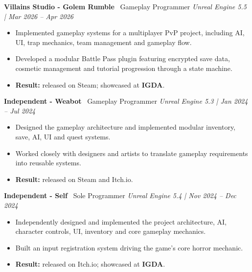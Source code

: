 \documentclass[8.5pt]{article}
\begin{document}
    \vspace{2pt}

    \textbf{Villains Studio - Golem Rumble} \textemdash\ Gameplay Programmer
    \hfill
    \textit{Unreal Engine 5.5 | Mar 2026 -- Apr 2026}

    \begin{itemize}
        \item Implemented gameplay systems for a multiplayer PvP project, including AI, UI, trap mechanics, team management and gameplay flow.
        \item Developed a modular Battle Pass plugin featuring encrypted save data, cosmetic management and tutorial progression through a state machine.
        \item \textbf{Result:} released on Steam; showcased at \textbf{IGDA}.
    \end{itemize}

    \vspace{2pt}

    \textbf{Independent - Weabot} \textemdash\ Gameplay Programmer
    \hfill
    \textit{Unreal Engine 5.3 | Jan 2024 -- Jul 2024}

    \begin{itemize}
        \item Designed the gameplay architecture and implemented modular inventory, save, AI, UI and quest systems.
        \item Worked closely with designers and artists to translate gameplay requirements into reusable systems.
        \item \textbf{Result:} released on Steam and Itch.io.
    \end{itemize}

    \vspace{2pt}

    \textbf{Independent - Self} \textemdash\ Sole Programmer
    \hfill
    \textit{Unreal Engine 5.4 | Nov 2024 -- Dec 2024}

    \begin{itemize}
        \item Independently designed and implemented the project architecture, AI, character controls, UI, inventory and core gameplay mechanics.
        \item Built an input registration system driving the game's core horror mechanic.
        \item \textbf{Result:} released on Itch.io; showcased at \textbf{IGDA}.
    \end{itemize}
\end{document}
